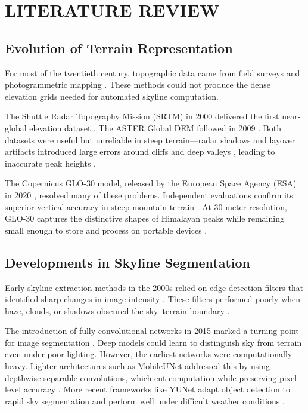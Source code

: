 \chapter{LITERATURE REVIEW}

\section{Evolution of Terrain Representation}
For most of the twentieth century, topographic data came from field surveys and photogrammetric mapping \cite{usery2019topographic}. These methods could not produce the dense elevation grids needed for automated skyline computation.

The Shuttle Radar Topography Mission (SRTM) in 2000 delivered the first near-global elevation dataset \cite{Franks2023}. The ASTER Global DEM followed in 2009 \cite{pan2020camera}. Both datasets were useful but unreliable in steep terrain---radar shadows and layover artifacts introduced large errors around cliffs and deep valleys \cite{pan2020camera, Franks2023}, leading to inaccurate peak heights \cite{pan2020camera}.

The Copernicus GLO-30 model, released by the European Space Agency (ESA) in 2020 \cite{Franks2023, Trevisani2023}, resolved many of these problems. Independent evaluations confirm its superior vertical accuracy in steep mountain terrain \cite{Franks2023}. At 30-meter resolution, GLO-30 captures the distinctive shapes of Himalayan peaks while remaining small enough to store and process on portable devices \cite{pan2020camera, Steger2022}.

\section{Developments in Skyline Segmentation}
Early skyline extraction methods in the 2000s relied on edge-detection filters that identified sharp changes in image intensity \cite{yang2007robust}. These filters performed poorly when haze, clouds, or shadows obscured the sky--terrain boundary \cite{pan2020camera}.

The introduction of fully convolutional networks in 2015 marked a turning point for image segmentation \cite{long2015fully}. Deep models could learn to distinguish sky from terrain even under poor lighting. However, the earliest networks were computationally heavy. Lighter architectures such as MobileUNet addressed this by using depthwise separable convolutions, which cut computation while preserving pixel-level accuracy \cite{howard2019mobilenetv3}. More recent frameworks like YUNet adapt object detection to rapid sky segmentation and perform well under difficult weather conditions \cite{Yang2025}.

